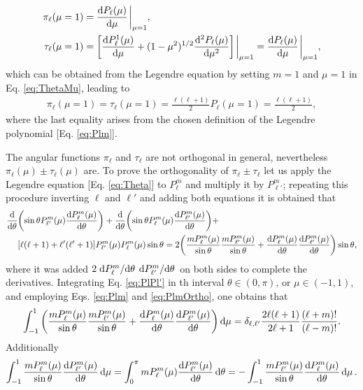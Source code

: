 %
\begin{align}
\pi_\ell(\mu=1) & =  \dv{P_\ell(\mu)}{\mu}\eval_{\mu=1},\\
\tau_\ell (\mu = 1) & = \qty[\dv{P_\ell^1(\mu)}{\mu} + (1-\mu^2)^{1/2}\dv[2]{P_\ell(\mu)}{\mu}]\eval_{\mu=1} = \dv{P_\ell(\mu)}{\mu}\eval_{\mu=1},
\end{align}
%
which can be obtained from the Legendre equation  by setting $m = 1$ and $\mu = 1$ in Eq. \eqref{eq:ThetaMu}, leading to
%
\begin{align}
    \pi_\ell(\mu=1) = \tau_\ell(\mu=1) = \frac{\ell(\ell+1)}{2} P_\ell(\mu = 1) = \frac{\ell(\ell+1)}{2},
    \label{eq:PiTau1}
\end{align}
%
where the last equality arises from the chosen definition of the Legendre polynomial [Eq. \eqref{eq:Plm}].

The angular functions $\pi_\ell$  and $\tau_\ell$ are not orthogonal in general, nevertheless  $\pi_\ell(\mu)\pm\tau_\ell(\mu)$ are. To prove the orthogonality of $\pi_\ell\pm\tau_\ell$ let us apply the Legendre equation [Eq. \eqref{eq:Theta}] to $P_\ell^m$ and multiply it by $P_{\ell'}^m$; repeating this procedure inverting $\ell$ and $\ell'$ and adding both equations it is obtained that
%
\begin{align}
\dv{\theta}&\qty(\sin\theta P_{\ell'}^m(\mu)\dv{P_\ell^m(\mu)}{\theta}) +
\dv{\theta}\qty(\sin\theta P_{\ell}^m(\mu)\dv{P_{\ell'}^m(\mu)}{\theta}) +
\label{eq:PlPl'}
\\
&\qty[\ell(\ell+1)+\ell'(\ell'+1)]P_{\ell'}^m(\mu)P_{\ell}^m(\mu) \sin\theta
=
 2\qty(\frac{mP_\ell^m(\mu)}{\sin\theta}\frac{mP_{\ell'}^m(\mu)}{\sin\theta}+ \dv{P_\ell^m(\mu)}{\theta}\dv{P_{\ell'}^m(\mu)}{\theta})\sin\theta,\notag
\end{align}
%
where  it was added $2\dv*{P_\ell^m}{\theta}\dv*{P_{\ell'}^m}{\theta}$ on both sides to complete the derivatives. Integrating Eq. \eqref{eq:PlPl'} in th interval $\theta \in (0,\pi)$, or $\mu \in(-1,1)$, and employing Eqs. \eqref{eq:Plm} and \eqref{eq:PlmOrtho}, one obtains that
%
\begin{align}
\int_{-1}^1 \qty(\frac{mP_\ell^m(\mu)}{\sin\theta}\frac{mP_{\ell'}^m(\mu)}{\sin\theta}+ \dv{P_\ell^m(\mu)}{\theta}\dv{P_{\ell'}^m(\mu)}{\theta})\dd{\mu} =
\delta_{\ell,\ell'}\frac{2\ell(\ell+1)}{2\ell+1}\frac{(\ell+m)!}{(\ell-m)!}.
\label{eq:PimlTauml}
\end{align}
%
Additionally
%
\begin{align}
\int_{-1}^1\frac{mP_\ell^m(\mu)}{\sin\theta}\dv{P_{\ell'}^m(\mu)}{\theta}\dd{\mu}
 = \int_0^{\pi} mP_\ell^m(\mu)\dv{P_{\ell'}^m(\mu)}{\theta}\dd{\theta} =
 -\int_{-1}^1\frac{mP_{\ell'}^m(\mu)}{\sin\theta}\dv{P_{\ell}^m(\mu)}{\theta}\dd{\mu}.
 \label{eq:taupiCross}
\end{align}
